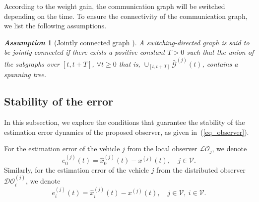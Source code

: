 \documentclass[letterpaper, 10pt, conference]{ieeeconf}  %
\def\eqref#1{(\ref{#1})}
\def\V{\mathcal{V}} %
\def\G{\mathcal{G}} %
\def\LO{\mathcal{LO}} %
\def\DO{\mathcal{DO}} %
\newtheorem{assumption}{\it Assumption}%
\begin{document}
According to the weight gain, the communication graph will be switched depending on the time. To ensure the connectivity of the communication graph, we list the following assumptions.
\begin{assumption}[Jointly connected graph \cite{hao2024eventtriggered,liu2021discretetime}]
\label{ass_graph}
A switching-directed graph is said to be jointly connected if there exists a positive constant $T > 0$ such that the union of the subgraphs over $[t, t+ T]$, $\forall t \geq 0$ that is, $\cup _{[t, t+ T]}\bar{\G}^{(j)}(t)$, contains a spanning tree.
\end{assumption}


\subsection{Stability of the error }

In this subsection, we explore the conditions that guarantee the stability of the
estimation error dynamics of the proposed observer, as given in~\eqref{eq_observer}.

For the estimation error of the vehicle $j$ from the local observer $\LO_{j}$, we denote
\begin{equation}
    e_0^{(j)}(t) = \hat{x}_0^{(j)}(t) - x^{(j)}(t), \quad j \in \V. 
\end{equation}
Similarly, for the estimation error of the vehicle $j$ from the distributed observer $\DO_{i}^{(j)}$, we denote
\begin{equation}
    e_i^{(j)}(t) = \hat{x}_i^{(j)}(t) - x^{(j)}(t), \quad j \in \V, \ i \in {\V}.
\end{equation}
\end{document}
